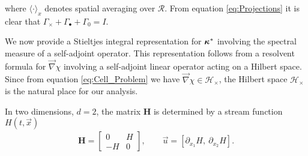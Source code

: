 \documentclass[11pt]{amsart}
\newcommand{\Hb}{\mathbf{H}}
\newcommand\bkappa{\mbox{\boldmath${\kappa}$}}
\begin{document}
%
where $\langle\cdot\rangle_x$ denotes spatial averaging over $\mathcal{R}$. From
equation \eqref{eq:Projections} it is clear that $\Gamma_\times+\Gamma_\bullet+\Gamma_0=I$.



We now provide a Stieltjes integral representation for $\bkappa^*$
involving the spectral measure of a self-adjoint operator. This
representation follows from a resolvent formula for $\vec{\nabla}\chi$
involving a self-adjoint linear operator acting on a Hilbert
space. Since from equation \eqref{eq:Cell_Problem} we have
$\vec{\nabla}\chi\in\mathscr{H}_\times$, the Hilbert space $\mathscr{H}_\times$ is the
natural place for our analysis.







In two dimensions, $d=2$, the matrix $\Hb$ is determined by a stream
function $H(t,\vec{x})$ 
%
\begin{align}\label{eq:u_H}  
  \Hb=\left[
  \begin{array}{cc}
    0  & H\\
    -H & 0
  \end{array}
  \right],
  \qquad
  \vec{u}=[\partial_{x_1}H, \ \partial_{x_2}H].
\end{align}
%

\newpage
\end{document}
